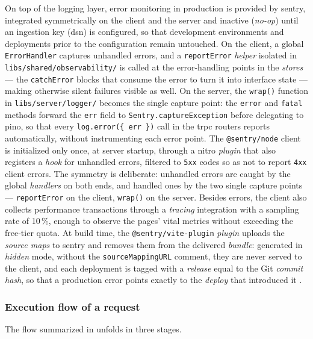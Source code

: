 On top of the logging layer, error monitoring in production is provided by \gls{sentry}, integrated symmetrically on the client and the server and inactive (\textit{no-op}) until an ingestion key (\acrshort{dsn}) is configured, so that development environments and deployments prior to the configuration remain untouched. On the client, a global \texttt{ErrorHandler} captures unhandled errors, and a \texttt{reportError} \textit{helper} isolated in \texttt{libs/shared/observability/} is called at the error-handling points in the \textit{stores} --- the \texttt{catchError} blocks that consume the error to turn it into interface state --- making otherwise silent failures visible as well. On the server, the \texttt{wrap()} function in \texttt{libs/server/logger/} becomes the single capture point: the \texttt{error} and \texttt{fatal} methods forward the \texttt{err} field to \texttt{Sentry.captureException} before delegating to \gls{pino}, so that every \texttt{log.error(\{ err \})} call in the \gls{trpc} routers reports automatically, without instrumenting each error point. The \texttt{@sentry/node} client is initialized only once, at server startup, through a \gls{nitro} \textit{plugin} that also registers a \textit{hook} for unhandled errors, filtered to \texttt{5xx} codes so as not to report \texttt{4xx} client errors. The symmetry is deliberate: unhandled errors are caught by the global \textit{handlers} on both ends, and handled ones by the two single capture points --- \texttt{reportError} on the client, \texttt{wrap()} on the server. Besides errors, the client also collects performance transactions through a \textit{tracing} integration with a sampling rate of 10\,\%, enough to observe the pages' vital metrics without exceeding the free-tier quota. At build time, the \texttt{@sentry/\allowbreak vite-plugin} \textit{plugin} uploads the \textit{source maps} to \gls{sentry} and removes them from the delivered \textit{bundle}: generated in \textit{hidden} mode, without the \texttt{sourceMappingURL} comment, they are never served to the client, and each deployment is tagged with a \textit{release} equal to the Git \textit{commit} \textit{hash}, so that a production error points exactly to the \textit{deploy} that introduced it \cite{sentry}.

\subsubsection{Execution flow of a request}\label{subsec:flux-executie}

The flow summarized in  unfolds in three stages.

